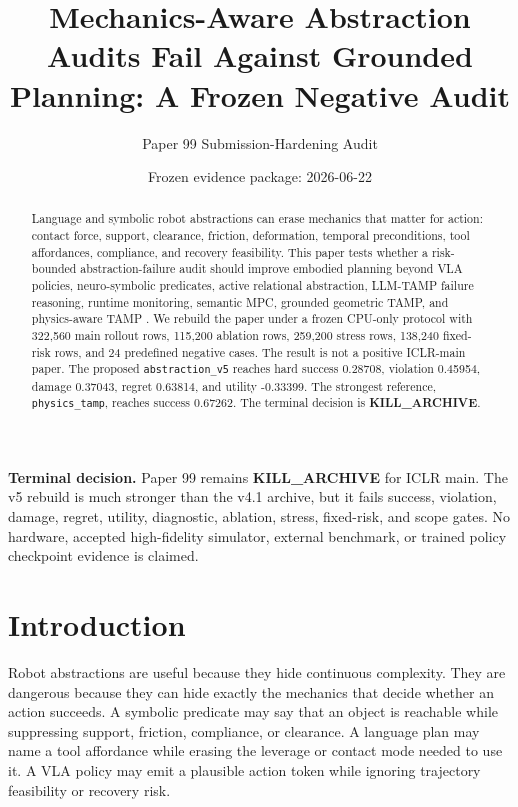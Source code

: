 \documentclass[11pt]{article}
\title{Mechanics-Aware Abstraction Audits Fail Against Grounded Planning: A Frozen Negative Audit}
\author{Paper 99 Submission-Hardening Audit}
\date{Frozen evidence package: 2026-06-22}
\newcommand{\method}[1]{\texttt{#1}}
\begin{document}
\maketitle

\begin{abstract}
Language and symbolic robot abstractions can erase mechanics that matter for action: contact force, support, clearance, friction, deformation, temporal preconditions, tool affordances, compliance, and recovery feasibility. This paper tests whether a risk-bounded abstraction-failure audit should improve embodied planning beyond VLA policies, neuro-symbolic predicates, active relational abstraction, LLM-TAMP failure reasoning, runtime monitoring, semantic MPC, grounded geometric TAMP, and physics-aware TAMP \citep{li2023embodied1,liang2024visualpredicator2,devinda3} \citep{farid2026vision4,ahn2025towards5,park2025hierarchical6}. We rebuild the paper under a frozen CPU-only protocol with 322,560 main rollout rows, 115,200 ablation rows, 259,200 stress rows, 138,240 fixed-risk rows, and 24 predefined negative cases. The result is not a positive ICLR-main paper. The proposed \method{abstraction\_v5} reaches hard success 0.28708, violation 0.45954, damage 0.37043, regret 0.63814, and utility -0.33399. The strongest reference, \method{physics\_tamp}, reaches success 0.67262. The terminal decision is \textbf{KILL\_ARCHIVE}.
\end{abstract}

\textbf{Terminal decision.} Paper 99 remains \textbf{KILL\_ARCHIVE} for ICLR main. The v5 rebuild is much stronger than the v4.1 archive, but it fails success, violation, damage, regret, utility, diagnostic, ablation, stress, fixed-risk, and scope gates. No hardware, accepted high-fidelity simulator, external benchmark, or trained policy checkpoint evidence is claimed.

\section{Introduction}
Robot abstractions are useful because they hide continuous complexity. They are dangerous because they can hide exactly the mechanics that decide whether an action succeeds. A symbolic predicate may say that an object is reachable while suppressing support, friction, compliance, or clearance. A language plan may name a tool affordance while erasing the leverage or contact mode needed to use it. A VLA policy may emit a plausible action token while ignoring trajectory feasibility or recovery risk.
\end{document}
